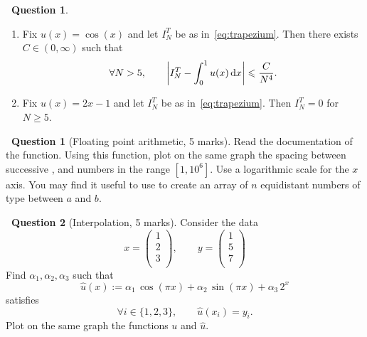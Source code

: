\documentclass[11pt]{article}
\theoremstyle{definition}
\newtheorem{question}{{\normalfont \faGears}~Question}
\newtheorem{compexercise}{{\normalfont \faLaptop}~Question}
\begin{document}
\begin{question}
\begin{enumerate}
        \item
            Fix $u(x) = \cos(x)$ and let $I^T_N$ be as in~\eqref{eq:trapezium}.
            Then there exists $C \in (0, \infty)$ such that
            \[
                \forall N > 5, \qquad
                \left\lvert I^T_N - \int_{0}^1 u(x) \, \mathrm d x \right\rvert \leqslant \frac{C}{N^4}.
            \]

        \item
            Fix $u(x) = 2x - 1$ and let $I^T_N$ be as in~\eqref{eq:trapezium}.
            Then $I^T_N = 0$ for $N \geq 5$.
    \end{enumerate}
\end{question}

\newpage

\begin{compexercise}
    [Floating point arithmetic, 5 marks]
    Read the documentation of the  function.
    Using this function,
    plot on the same graph the spacing between successive ,  and  numbers in the range $[1, 10^6]$.
    Use a logarithmic scale for the $x$ axis.
    You may find it useful to use 
    to create an array of $n$ equidistant numbers of type  between $a$ and $b$.
\end{compexercise}

\begin{compexercise}
    [Interpolation, 5 marks]
    Consider the data
    \[
        x =
        \begin{pmatrix}
            1 \\
            2 \\
            3 \\
        \end{pmatrix},
        \qquad
        y =
        \begin{pmatrix}
            1 \\
            5 \\
            7 \\
        \end{pmatrix}
    \]
    Find $\alpha_1, \alpha_2, \alpha_3$ such that
    \[
        \widehat u(x) := \alpha_1 \, \cos(\pi x) + \alpha_2 \, \sin(\pi x) + \alpha_3 \, 2^x
    \]
    satisfies
    \[
        \forall i \in \{1, 2, 3\}, \qquad
        \widehat u(x_i) = y_i.
    \]
    Plot on the same graph the functions $u$ and $\widehat u$.
\end{compexercise}
\end{document}
